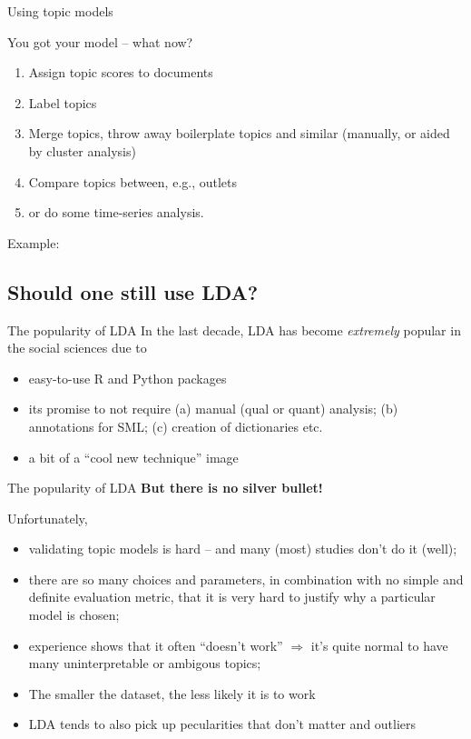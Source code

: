 \begin{frame}{Using topic models}

You got your model -- what now?

\begin{enumerate}
\item Assign topic scores to documents
\item Label topics
\item Merge topics, throw away boilerplate topics and similar (manually, or aided by cluster analysis)
\item Compare topics between, e.g., outlets
\item or do some time-series analysis.
\end{enumerate}


Example: \cite{Tsur2015}

\end{frame}






\subsection{Should one still use LDA?}


\begin{frame}{The popularity of LDA}
In the last decade, LDA has become \emph{extremely} popular in the social sciences due to
  \begin{itemize}
  \item easy-to-use R and Python packages
  \item its promise to not require (a) manual (qual or quant) analysis; (b) annotations for SML; (c) creation of dictionaries etc.
  \item a bit of a ``cool new technique'' image
  \end{itemize}
\end{frame}


\begin{frame}{The popularity of LDA}
  \textbf{But there is no silver bullet!}

  Unfortunately,
  \begin{itemize}
  \item validating topic models is hard -- and many (most) studies don't do it (well);
  \item there are so many choices and parameters, in combination with no simple and definite evaluation metric, that it is very hard to justify why a particular model is chosen;
  \item experience shows that it often ``doesn't work'' $\Rightarrow$ it's quite normal to have many uninterpretable or ambigous topics;
  \item The smaller the dataset, the less likely it is to work
  \item LDA tends to also pick up pecularities that don't matter and outliers
  \end{itemize}
\end{frame}


